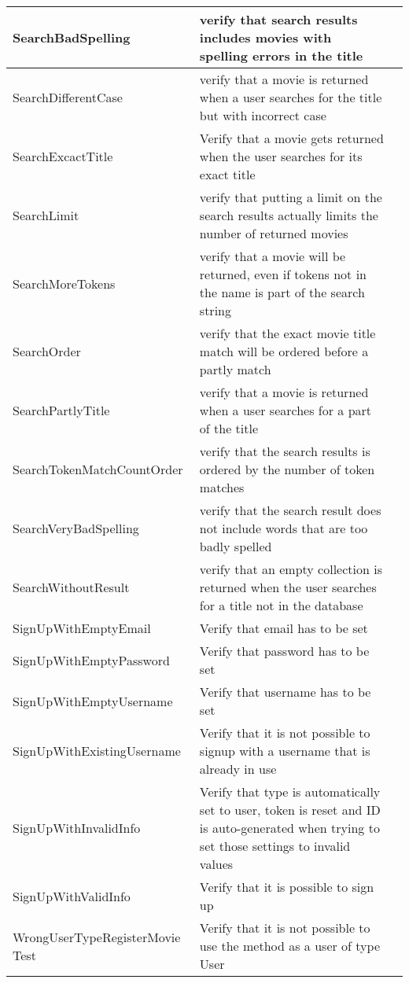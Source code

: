 \begin{centering}
\begin{longtable}{| p{5 cm} | p{9 cm} | c |}
\hline
SearchBadSpelling & verify that search results includes movies with spelling errors in the title & \\
\hline
SearchDifferentCase & verify that a movie is returned when a user searches for the title but with incorrect case & \\
\hline
SearchExcactTitle & Verify that a movie gets returned when the user searches for its exact title & \\
\hline
SearchLimit & verify that putting a limit on the search results actually limits the number of returned movies & \\
\hline
SearchMoreTokens & verify that a movie will be returned, even if tokens not in the name is part of the search string & \\
\hline
SearchOrder & verify that the exact movie title match will be ordered before a partly match & \\
\hline
SearchPartlyTitle & verify that a movie is returned when a user searches for a part of the title & \\
\hline
SearchTokenMatchCountOrder & verify that the search results is ordered by the number of token matches & \\
\hline
SearchVeryBadSpelling & verify that the search result does not include words that are too badly spelled & \\
\hline
SearchWithoutResult & verify that an empty collection is returned when the user searches for a title not in the database & \\
\hline
SignUpWithEmptyEmail & Verify that email has to be set & \\
\hline
SignUpWithEmptyPassword & Verify that password has to be set & \\
\hline
SignUpWithEmptyUsername & Verify that username has to be set & \\
\hline
SignUpWithExistingUsername & Verify that it is not possible to signup with a username that is already in use & \\
\hline
SignUpWithInvalidInfo & Verify that type is automatically set to user, token is reset and ID is auto-generated when trying to set those settings to invalid values & \\
\hline
SignUpWithValidInfo & Verify that it is possible to sign up & \\
\hline
WrongUserTypeRegisterMovie Test & Verify that it is not possible to use the method as a user of type User & \\
\hline
\end{longtable}
\end{centering}

